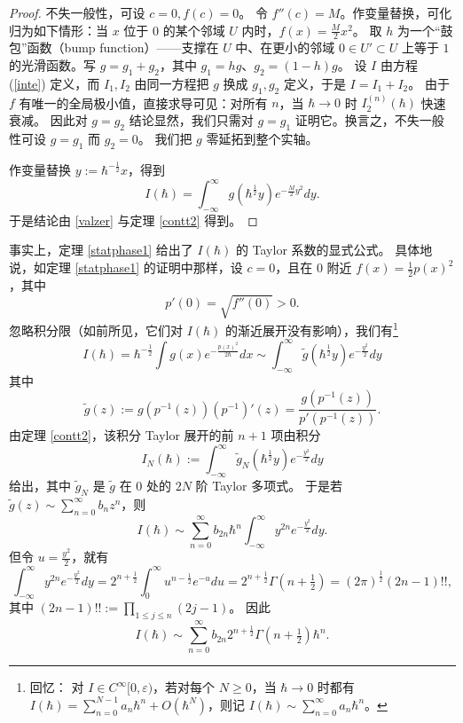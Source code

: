 \begin{proof} 不失一般性，可设 $c=0,f(c)=0$。
令 $f''(c)=M$。作变量替换，可化归为如下情形：当 $x$ 位于 $0$ 的某个邻域 $U$ 内时，$f(x)=\frac{M}{2}x^2$。
取 $h$ 为一个“鼓包”函数（bump function）——支撑在 $U$ 中、在更小的邻域 $0\in U'\subset U$ 上等于 $1$ 的光滑函数。写
$g=g_1+g_2$，其中 $g_1=hg$、$g_2=(1-h)g$。
设 $I$ 由方程 (\ref{inte}) 定义，而 $I_1,I_2$ 由同一方程把 $g$ 换成 $g_1,g_2$ 定义，于是 $I=I_1+I_2$。
由于 $f$ 有唯一的全局极小值，直接求导可见：对所有 $n$，当 $\hbar\to 0$ 时 $I_2^{(n)}(\hbar)$ 快速衰减。
因此对 $g=g_2$ 结论显然，我们只需对 $g=g_1$ 证明它。换言之，不失一般性可设 $g=g_1$ 而 $g_2=0$。
我们把 $g$ 零延拓到整个实轴。

作变量替换 $y:=\hbar^{-\frac{1}{2}}x$，得到
\begin{equation}\label{inte1}
I(\hbar)=\int_{-\infty}^{\infty}g(\hbar^{\frac{1}{2}} y)e^{-\frac{M}{2}y^2}dy.
\end{equation} 
于是结论由 \eqref{valzer} 与定理 \ref{contt2} 得到。
\end{proof} 

\begin{remark}\label{exform} 事实上，定理 \ref{statphase1} 给出了 $I(\hbar)$ 的 Taylor 系数的显式公式。
具体地说，如定理 \ref{statphase1} 的证明中那样，设 $c=0$，且在 $0$ 附近 $f(x)=\frac{1}{2}p(x)^2$，其中
$$
p'(0)=\sqrt{f''(0)}>0.
$$ 
忽略积分限（如前所见，它们对 $I(\hbar)$ 的渐近展开没有影响），我们有\footnote{回忆：
对 $I\in C^\infty[0,\varepsilon)$，若对每个 $N\ge 0$，当 $\hbar\to 0$ 时都有
$I(\hbar)=\sum_{n=0}^{N-1} a_n\hbar^n+O(\hbar^N)$，则记 $I(\hbar)\sim \sum_{n=0}^\infty a_n\hbar^n$。} 
$$
I(\hbar)=\hbar^{-\frac{1}{2}}\int g(x)e^{-\frac{p(x)^2}{2\hbar}}dx\sim \int_{-\infty}^\infty \widetilde g(\hbar^{\frac{1}{2}}y)e^{-\frac{y^2}{2}}dy
$$
其中
$$
\widetilde g(z):=g(p^{-1}(z))(p^{-1})'(z)=\frac{g(p^{-1}(z))}{p'(p^{-1}(z))}.
$$ 
由定理 \ref{contt2}，该积分 Taylor 展开的前 $n+1$ 项由积分
$$
I_N(\hbar):=\int_{-\infty}^\infty \widetilde g_N(\hbar^{\frac{1}{2}}y)e^{-\frac{y^2}{2}}dy
$$
给出，其中 $\widetilde g_N$ 是 $\widetilde g$ 在 $0$ 处的 $2N$ 阶 Taylor 多项式。
于是若 $\widetilde g(z)\sim \sum_{n=0}^\infty b_nz^n$，则
$$
I(\hbar)\sim \sum_{n=0}^\infty b_{2n}\hbar^n\int_{-\infty}^\infty y^{2n}e^{-\frac{y^2}{2}}dy.
$$
但令 $u=\frac{y^2}{2}$，就有
\begin{equation}\label{gammaint}
\int_{-\infty}^\infty y^{2n}e^{-\frac{y^2}{2}}dy=
2^{n+\frac{1}{2}}\int_0^\infty u^{n-\frac{1}{2}} e^{-u}du=
2^{n+\frac{1}{2}}\Gamma(n+\tfrac{1}{2})=(2\pi)^{\frac{1}{2}}(2n-1)!!,
\end{equation}
其中 $(2n-1)!!:=\prod_{1\le j\le n}(2j-1)$。
因此
$$
I(\hbar)\sim \sum_{n=0}^\infty b_{2n}
2^{n+\frac{1}{2}}\Gamma(n+\tfrac{1}{2})\hbar^n. 
$$
\end{remark} 

